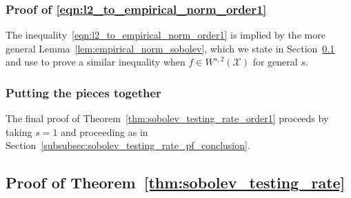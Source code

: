 \documentclass{article}
\newcommand{\1}{\mathbf{1}}
\newcommand{\Xset}{\mathcal{X}}
\theoremstyle{alden}
\theoremstyle{aldenthm}
\theoremstyle{definition}
\theoremstyle{remark}
\begin{document}
\subsubsection{Proof of \eqref{eqn:l2_to_empirical_norm_order1}}
The inequality~\eqref{eqn:l2_to_empirical_norm_order1} is implied by the more general Lemma~\ref{lem:empirical_norm_sobolev}, which we state in Section~\ref{subsec:sobolev_testing_rate_pf} and use to prove a similar inequality when $f \in W^{s,2}(\Xset)$ for general $s$. 

\subsubsection{Putting the pieces together}

The final proof of Theorem~\ref{thm:sobolev_testing_rate_order1} proceeds by taking $s = 1$ and proceeding as in Section~\ref{subsubsec:sobolev_testing_rate_pf_conclusion}.


\subsection{Proof of Theorem~\ref{thm:sobolev_testing_rate}}
\label{subsec:sobolev_testing_rate_pf}
\end{document}
